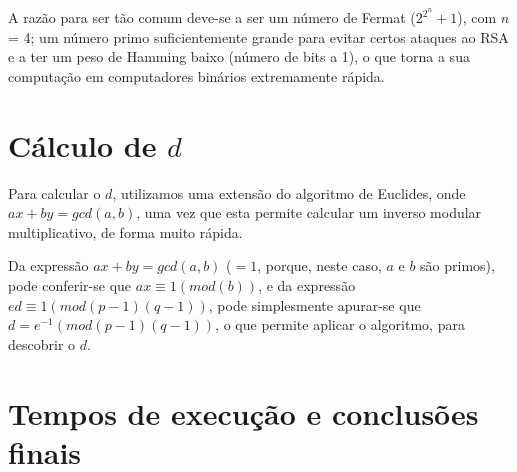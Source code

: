 \documentclass[dvipsnames]{article}
\begin{document}
\vskip 0.4cm

\noindent A razão para ser tão comum deve-se a ser um número de Fermat (${2^{2^n}}+1$), com $n$ = 4; um número primo suficientemente grande para evitar certos ataques ao RSA e a ter um peso de Hamming baixo (número de bits a 1), o que torna a sua computação em computadores binários extremamente rápida.

\section{Cálculo de $d$}
Para calcular o $d$, utilizamos uma extensão do algoritmo de Euclides, onde $ax + by = gcd(a,b)$, uma vez que esta permite calcular um inverso modular multiplicativo, de forma muito rápida.

\vskip 0.4cm

\noindent Da expressão $ax + by = gcd(a,b)$ ($=1$, porque, neste caso, $a$ e $b$ são primos), pode conferir-se que $ax \equiv 1 (mod (b))$, e da expressão $ed \equiv 1 (mod (p-1)(q-1))$, pode simplesmente apurar-se que $d = e^{-1} (mod (p-1)(q-1))$, o que permite aplicar o algoritmo, para descobrir o $d$.

\section{Tempos de execução e conclusões finais}



\end{document}
